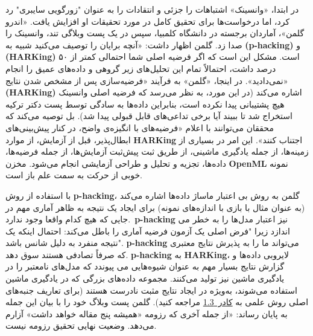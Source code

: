 در ابتدا، «وانسینک» اشتباهات را جزئی و انتقادات را به عنوان "زورگویی سایبری" رد کرد، اما درخواست‌ها برای تحقیق کامل در مورد تحقیقات او افزایش یافت.
«اندرو گلمن»، آماردان برجسته در دانشگاه کلمبیا، سپس در یک پست وبلاگی تند، وانسینک را صدا زد.
گلمن اظهار داشت: «آنچه برایان را توصیف می‌کنید شبیه به \textenglish{\textbf{(p-hacking)}} و \textenglish{\textbf{(HARKing)}} است.
مشکل این است که اگر فرضیه اصلی شما احتمالی کمتر از ۵۰ درصد داشت، احتمالاً تمام این تحلیل‌های زیر گروهی و داده‌های عمیق را انجام نمی‌دادید».
در اینجا، «گلمن» به فرآیند «فرضیه‌سازی پس از مشخص شدن نتایج» \textenglish{\textbf{(HARKing)}} اشاره می‌کند (در این مورد، به نظر می‌رسد که فرضیه اصلی وانسینک هیچ پشتیبانی پیدا نکرده است، بنابراین داده‌ها به سادگی توسط پست دکتر ترکیه استخراج شد تا ببیند آیا برخی تداعی‌های قابل قبولی پیدا شد).
بل توصیه می‌کند که محققان می‌توانند با اعلام «فرضیه‌های با انگیزه‌ی واضح، در کنار پیش‌بینی‌های ابطال‌پذیر، قبل از آزمایش، از موارد \textenglish{\textbf{HARKing}} اجتناب کنند».
این امر در بسیاری از زمینه‌ها، از جمله یادگیری ماشینی، از طریق ثبت پیش‌ثبت آزمایش‌ها، از جمله فرضیه‌ها، داده‌ها، تجزیه و تحلیل و طراحی آزمایشی انجام می‌شود.
مخزن \textenglish{\textbf{OpenML}} نمونه خوبی از حرکت به سمت علم باز است.

با استفاده از روش \textenglish{\textbf{p-hacking}}، گلمن به روش بی اعتبار ماساژ داده‌ها اشاره می‌کند (به عنوان مثال با بازی با اندازه‌های نمونه) برای ایجاد یک نتیجه به ظاهر آماری مهم در جایی که هیچ کدام واقعا وجود ندارد.\ \textenglish{\textbf{p-hacking}} نیز اعتبار مدل‌ها را به خطر می اندازد زیرا "فرض اصلی یک آزمون فرضیه آماری را باطل می‌کند: احتمال اینکه یک نتیجه منفرد به دلیل شانس باشد".
\mbox{\textenglish{\textbf{p-hacking}}} می‌تواند ما را به پذیرش نتایج معتبری که صرفاً تصادفی هستند سوق دهد.
\textenglish{\textbf{p-hacking}} به \textenglish{\textbf{HARKing}}، لایروبی داده‌ها و گزارش نتایج بسیار مهم به عنوان شیوه‌هایی می پیوندد که مدل‌های نامعتبر را در یادگیری ماشین نیز تولید می‌کنند.
مجموعه داده‌های بزرگی که در یادگیری ماشین استفاده می‌شوند، به‌ویژه در ایجاد نتایج مثبت نادرست هستند (برای تعاریف جنبه‌های اصلی روش علمی به \hyperref[sec:جعبه 1.3]{\mbox{کادر 1.3}} مراجعه کنید).
گلمن پست وبلاگ خود را با بیان این جمله به پایان رساند: «از جمله آخری که رزومه «همیشه پنج مقاله خواهد داشت» آزارم می‌دهد.
وضعیت نهایی تحقیق رزومه نیست.


